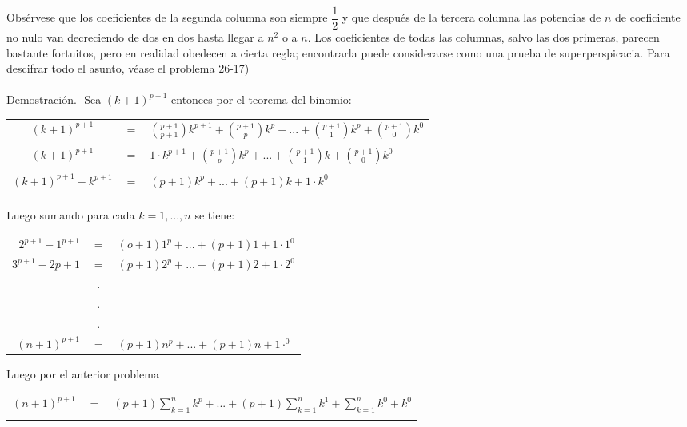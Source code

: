 \begin{enumerate}
\begin{center}
      \end{center}
      Obsérvese que los coeficientes de la segunda columna son siempre $\dfrac{1}{2}$ y que después de la tercera columna las potencias de $n$ de coeficiente no nulo van decreciendo de dos en dos hasta llegar a $n^2$ o a $n$. Los coeficientes de todas las columnas, salvo las dos primeras, parecen bastante fortuitos, pero en realidad obedecen a cierta regla; encontrarla puede considerarse como una prueba de superperspicacia. Para descifrar todo el asunto, véase el problema 26-17)\\\\
      Demostración.- Sea  $(k+1)^{p+1}$ entonces por el teorema del binomio:
      \begin{center}
	 \begin{tabular}{crl}
	    $(k+1)^{p+1}$&$=$&${p+1 \choose p+1} k^{p+1}+{p+1 \choose p} k^p + ... + {p+1 \choose 1} k^p + {p+1 \choose 0}k^0$\\\\
	    $(k+1)^{p+1}$&$=$&$1 \cdot k^{p+1} + {p+1 \choose p} k^p + ... + {p+1 \choose 1}k + {p+1 \choose 0} k^0$\\\\
	    $(k+1)^{p+1}-k^{p+1}$&$=$&$(p+1)k^p + ... + (p+1)k+1 \cdot k^0$\\\\
	 \end{tabular}
      \end{center}
      Luego sumando para cada $k=1,...,n$ se tiene:
      \begin{center}
	 \begin{tabular}{rcl}
	    $2^{p+1} - 1^{p+1}$&$=$&$(o+1)1^p + ... + (p+1)1 + 1 \cdot 1^0$ \\
	    $3^{p+1} -2{p+1}$&$=$&$(p+1)2^p + ... + (p+1)2+1\cdot 2^0$\\
	    &.&\\
	    &.&\\
	    &.&\\
	    $(n+1)^{p+1}$&$=$&$(p+1)n^{p}+...+(p+1)n + 1 \cdot ^0$\\
	 \end{tabular} 
      \end{center}
      Luego por el anterior problema 
      \begin{center}
	 \begin{tabular}{rcl}
	    $(n+1)^{p+1}$ & $=$ & $(p+1)\sum\limits_{k=1}^n k^p + ... + (p+1)\sum\limits_{k=1}^n k^1 + \sum\limits_{k=1}^n k^0 + k^0$\\\\

\end{tabular}
\end{center}
\end{enumerate}
